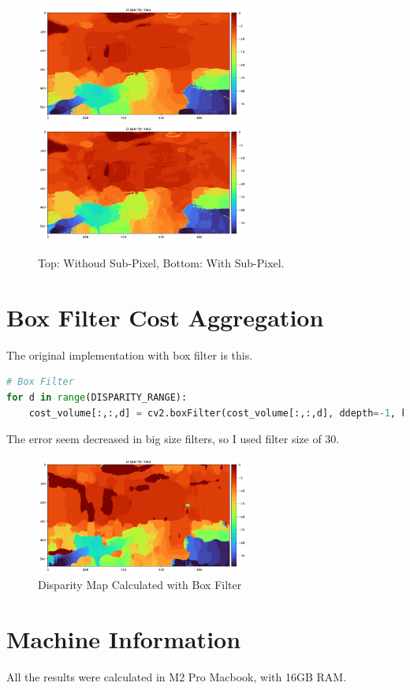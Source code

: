 \begin{figure}[h]
    \centering
    \includegraphics[width=7cm]{../result/disparity_map_nocorrection.png}
    \includegraphics[width=7cm]{../result/disparity_map_correction.png}
    \caption{Top: Withoud Sub-Pixel, Bottom: With Sub-Pixel.}
    \label{fig:result4}
    
\end{figure}
\section*{Box Filter Cost Aggregation}
The original implementation with box filter is this.
\begin{lstlisting}[language=python]
# Box Filter
for d in range(DISPARITY_RANGE):
    cost_volume[:,:,d] = cv2.boxFilter(cost_volume[:,:,d], ddepth=-1, ksize=(30, 30))
\end{lstlisting}
The error seem decreased in big size filters, so I used filter size of 30.
\begin{figure}
    \centering
    \includegraphics*[width=7cm]{../result/disparity_map_box.png}
    \caption{Disparity Map Calculated with Box Filter}
\end{figure}
\section*{Machine Information}
All the results were calculated in M2 Pro Macbook, with 16GB RAM.
